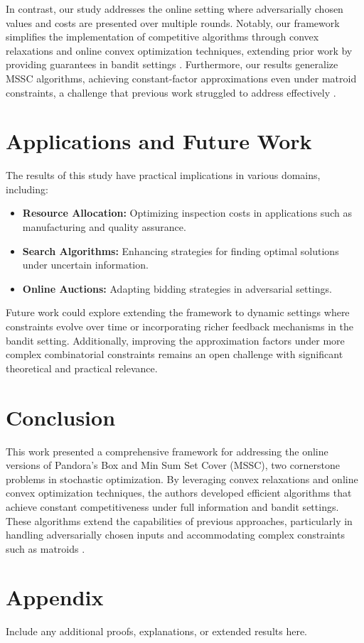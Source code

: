 \documentclass[11pt,a4paper]{article}
\begin{document}
In contrast, our study addresses the online setting where adversarially chosen values and costs are presented over multiple rounds. Notably, our framework simplifies the implementation of competitive algorithms through convex relaxations and online convex optimization techniques, extending prior work by providing guarantees in bandit settings \cite{gergatsouli2022online}. Furthermore, our results generalize MSSC algorithms, achieving constant-factor approximations even under matroid constraints, a challenge that previous work struggled to address effectively \cite{feige2004approximating}.

\section{Applications and Future Work}
The results of this study have practical implications in various domains, including:
\begin{itemize}
    \item \textbf{Resource Allocation:} Optimizing inspection costs in applications such as manufacturing and quality assurance.
    \item \textbf{Search Algorithms:} Enhancing strategies for finding optimal solutions under uncertain information.
    \item \textbf{Online Auctions:} Adapting bidding strategies in adversarial settings.
\end{itemize}

Future work could explore extending the framework to dynamic settings where constraints evolve over time or incorporating richer feedback mechanisms in the bandit setting. Additionally, improving the approximation factors under more complex combinatorial constraints remains an open challenge with significant theoretical and practical relevance.
\pagebreak

\section{Conclusion}
This work presented a comprehensive framework for addressing the online versions of Pandora’s Box and Min Sum Set Cover (MSSC), two cornerstone problems in stochastic optimization. By leveraging convex relaxations and online convex optimization techniques, the authors developed efficient algorithms that achieve constant competitiveness under full information and bandit settings. These algorithms extend the capabilities of previous approaches, particularly in handling adversarially chosen inputs and accommodating complex constraints such as matroids \cite{gergatsouli2022online}.

\appendix
\section{Appendix}
Include any additional proofs, explanations, or extended results here.



\end{document}
